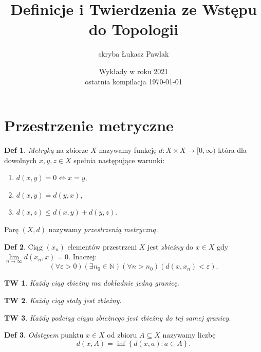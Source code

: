 \documentclass[a4paper, 12pt]{mwart}
\author{skryba Łukasz Pawlak}
\title{Definicje i Twierdzenia ze Wstępu do Topologii}
\date{Wykłady w roku 2021 \\ ostatnia kompilacja \today}
\theoremstyle{definition}
\newtheorem{definicja}{Def}[section]
\theoremstyle{plain}
\newtheorem{twierdzenie}{TW}[section]
\theoremstyle{remark}
\begin{document}
\maketitle
\section{Przestrzenie metryczne}
\begin{definicja}
	\emph{Metryką} na zbiorze $X$ nazywamy funkcję $d\colon X\times X\to [0, \infty)$ która dla dowolnych $x, y, z \in X$ spełnia następujące warunki:
	\begin{enumerate}
		\item $d(x, y) = 0 \iff x = y$,
		\item $d(x, y) = d(y, x)$,
		\item $d(x, z) \leq d(x, y) + d(y, z)$.
	\end{enumerate}
	Parę $(X, d)$ nazywamy \emph{przestrzenią metryczną}.
\end{definicja}
\begin{definicja}
	Ciąg $(x_n)$ elementów przestrzeni $X$ jest \emph{zbieżny} do $x\in X$ gdy $\lim\limits_{n \to \infty} d(x_n, x) = 0$. Inaczej:
	\begin{equation}
		\left(\forall \varepsilon > 0\right)\left(\exists n_0 \in \mathbb{N}\right)\left(\forall n > n_0\right)\left(d(x, x_n) < \varepsilon \right).
	\end{equation}
\end{definicja}
\begin{twierdzenie}
	Każdy ciąg zbieżny ma dokładnie jedną granicę.
\end{twierdzenie}
\begin{twierdzenie}
	Każdy ciąg stały jest zbieżny.
\end{twierdzenie}
\begin{twierdzenie}
	Każdy podciąg ciągu zbieżnego jest zbieżny do tej samej granicy.
\end{twierdzenie}
\begin{definicja}
	\emph{Odstępem} punktu $x \in X$ od %
	zbioru $A \subseteq X$ nazywamy liczbę
	\begin{equation}
		d(x, A) = \inf\left\{d(x, a)\colon a \in A\right\}.
	\end{equation}
\end{definicja}
\end{document}
